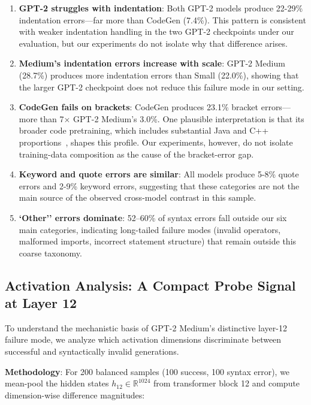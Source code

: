 \documentclass[preprint,12pt,authoryear]{elsarticle}
\begin{document}
\begin{enumerate}
\item \textbf{GPT-2 struggles with indentation}: Both GPT-2 models produce 22-29\% indentation errors---far more than CodeGen (7.4\%). This pattern is consistent with weaker indentation handling in the two GPT-2 checkpoints under our evaluation, but our experiments do not isolate why that difference arises.

\item \textbf{Medium's indentation errors increase with scale}: GPT-2 Medium (28.7\%) produces more indentation errors than Small (22.0\%), showing that the larger GPT-2 checkpoint does not reduce this failure mode in our setting.

\item \textbf{CodeGen fails on brackets}: CodeGen produces 23.1\% bracket errors---more than 7$\times$ GPT-2 Medium's 3.0\%. One plausible interpretation is that its broader code pretraining, which includes substantial Java and C++ proportions~\cite{nijkamp2022codegen}, shapes this profile. Our experiments, however, do not isolate training-data composition as the cause of the bracket-error gap.

\item \textbf{Keyword and quote errors are similar}: All models produce 5-8\% quote errors and 2-9\% keyword errors, suggesting that these categories are not the main source of the observed cross-model contrast in this sample.

\item \textbf{`Other'' errors dominate}: 52--60\% of syntax errors fall outside our six main categories, indicating long-tailed failure modes (invalid operators, malformed imports, incorrect statement structure) that remain outside this coarse taxonomy.
\end{enumerate}

\subsection{Activation Analysis: A Compact Probe Signal at Layer 12}

To understand the mechanistic basis of GPT-2 Medium's distinctive layer-12 failure mode, we analyze which activation dimensions discriminate between successful and syntactically invalid generations.

\textbf{Methodology}: For 200 balanced samples (100 success, 100 syntax error), we mean-pool the hidden states $h_{12} \in \mathbb{R}^{1024}$ from transformer block 12 and compute dimension-wise difference magnitudes:
\end{document}

